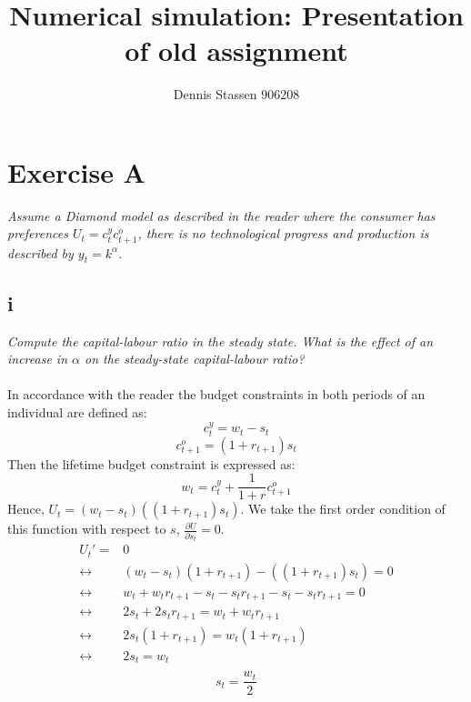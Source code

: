 \documentclass[11pt,a4paper]{article}
\begin{document}
\title{Numerical simulation: Presentation of old assignment}
\author{Dennis Stassen 906208}
\maketitle
\newpage

 \section{Exercise A}
\textit{Assume a Diamond model as described in the reader where the consumer has preferences $U_t=c^y_tc^o_{t+1}$, there is no technological progress and production is described by $y_t=k^\alpha$.}
    \subsection{i}
\textit{Compute the capital-labour ratio in the steady state. What is the effect of an increase in $\alpha$ on the steady-state capital-labour ratio?} \\ \\
In accordance with the reader the budget constraints in both periods of an individual are defined as:
\begin{equation}
c^y_t=w_t-s_t
\end{equation}
\begin{equation}
c^o_{t+1}=(1+r_{t+1})s_t
\end{equation}
Then the lifetime budget constraint is expressed as:
\begin{equation}
w_t=c^y_t + \frac{1}{1+r}c^o_{t+1}
\end{equation}
Hence, $U_t=(w_t-s_t)((1+r_{t+1})s_t)$. We take the first order condition of this function with respect to $s$, $\frac{\partial U}{\partial s_t}=0$.
\begin{align*}
U_t'=&0 \\
\leftrightarrow& (w_t-s_t)(1+r_{t+1})-((1+r_{t+1})s_t)=0 \\
\leftrightarrow& w_t+w_tr_{t+1}-s_t-s_tr_{t+1}-s_t-s_tr_{t+1}=0 \\
\leftrightarrow& 2s_t+2s_tr_{t+1}=w_t+w_tr_{t+1} \\
\leftrightarrow& 2s_t(1+r_{t+1})=w_t(1+r_{t+1}) \\
\leftrightarrow& 2s_t=w_t \\
\end{align*}
\begin{equation}
s_t=\frac{w_t}{2}
\end{equation}
\end{document}
